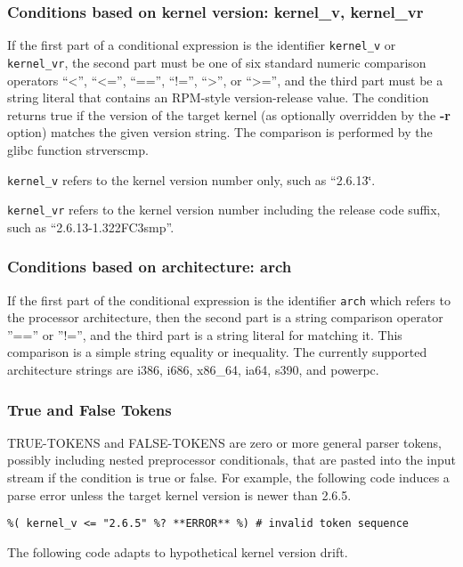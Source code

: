 \documentclass[twoside,english]{article}
\newenvironment{vindent}
{\begin{list}{}{\setlength{\listparindent}{6pt}}
\item[]}
{\end{list}}
\begin{document}
\subsubsection{Conditions based on kernel version: kernel\_v, kernel\_vr}
If the first part of a conditional expression is the identifier \texttt{kernel\_v}
or \texttt{kernel\_vr}, the second part must be one of six standard numeric
comparison operators {}``\textless'', {}``\textless ='', {}``=='', {}``!='', {}``\textgreater'',
or {}``\textgreater ='',
and the third part must be a string literal that contains an RPM-style version-release
value. The condition returns true if the version of the target kernel (as
optionally overridden by the \textbf{-r} option) matches the given version
string. The comparison is performed by the glibc function strverscmp.

\texttt{kernel\_v} refers to the kernel version number only, such as {}``2.6.13\char`\"{}.

\texttt{kernel\_vr} refers to the kernel version number including the release
code suffix, such as {}``2.6.13-1.322FC3smp''.


\subsubsection{Conditions based on architecture: arch}
If the first part of the conditional expression is the identifier \texttt{arch}
which refers to the processor architecture, then the second part is a string
comparison operator ''=='' or ''!='', and the third part is a string
literal for matching it. This comparison is a simple string equality or inequality.
The currently supported architecture strings are i386, i686, x86\_64, ia64,
s390, and powerpc.


\subsubsection{True and False Tokens}
TRUE-TOKENS and FALSE-TOKENS are zero or more general parser tokens, possibly
including nested preprocessor conditionals, that are pasted into the input
stream if the condition is true or false. For example, the following code
induces a parse error unless the target kernel version is newer than 2.6.5.

\begin{vindent}
\begin{verbatim}
%( kernel_v <= "2.6.5" %? **ERROR** %) # invalid token sequence
\end{verbatim}
\end{vindent}
The following code adapts to hypothetical kernel version drift.
\end{document}

